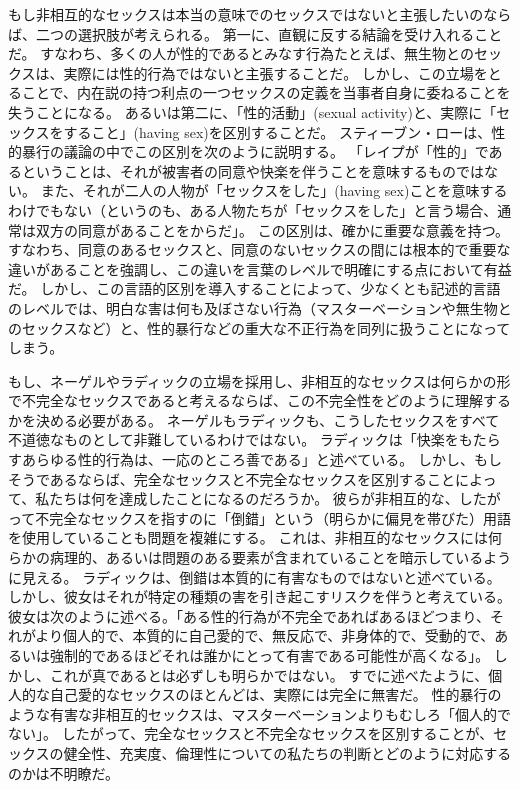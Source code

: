 \documentclass[paper=a4,book,openany]{jlreq} \usepackage{mystyle}
\begin{document}
もし非相互的なセックスは本当の意味でのセックスではないと主張したいのならば、二つの選択肢が考えられる。
第一に、直観に反する結論を受け入れることだ。
すなわち、多くの人が性的であるとみなす行為{\DDASH}たとえば、無生物とのセックス{\DDASH}は、実際には性的行為ではないと主張することだ。
しかし、この立場をとることで、内在説の持つ利点の一つ{\DDASH}セックスの定義を当事者自身に委ねること{\DDASH}を失うことになる。
あるいは第二に、「性的活動」(sexual activity)と、実際に「セックスをすること」(having sex)を区別することだ。
スティーブン・ローは、性的暴行の議論の中でこの区別を次のように説明する。
「レイプが「性的」であるということは、それが被害者の同意や快楽を伴うことを意味するものではない。
また、それが二人の人物が「セックスをした」(having sex)ことを意味するわけでもない（というのも、ある人物たちが「セックスをした」と言う場合、通常は双方の同意があることをからだ」\citep[p. 69]{law09:_rape_is_sex_act}。
この区別は、確かに重要な意義を持つ。
すなわち、同意のあるセックスと、同意のないセックスの間には根本的で重要な違いがあることを強調し、この違いを言葉のレベルで明確にする点において有益だ。
しかし、この言語的区別を導入することによって、少なくとも記述的言語のレベルでは、明白な害は何も及ぼさない行為（マスターベーションや無生物とのセックスなど）と、性的暴行などの重大な不正行為を同列に扱うことになってしまう。

もし、ネーゲルやラディックの立場を採用し、非相互的なセックスは何らかの形で不完全なセックスであると考えるならば、この不完全性をどのように理解するかを決める必要がある。
ネーゲルもラディックも、こうしたセックスをすべて不道徳なものとして非難しているわけではない。
ラディックは「快楽をもたらすあらゆる性的行為は、一応のところ善である」と述べている\citep[p.100]{ruddick75:_better_sex}。
しかし、もしそうであるならば、完全なセックスと不完全なセックスを区別することによって、私たちは何を達成したことになるのだろうか。
彼らが非相互的な、したがって不完全なセックスを指すのに「倒錯」という（明らかに偏見を帯びた）用語を使用していることも問題を複雑にする。
これは、非相互的なセックスには何らかの病理的、あるいは問題のある要素が含まれていることを暗示しているように見える。
ラディックは、倒錯は本質的に有害なものではないと述べている。
しかし、彼女はそれが特定の種類の害を引き起こすリスクを伴うと考えている。
彼女は次のように述べる。「ある性的行為が不完全であればあるほど{\DDASH}つまり、それがより個人的で、本質的に自己愛的で、無反応で、非身体的で、受動的で、あるいは強制的であるほど{\DDASH}それは誰かにとって有害である可能性が高くなる」\citep[pp. 100--101]{ruddick75:_better_sex}。
しかし、これが真であるとは必ずしも明らかではない。
すでに述べたように、個人的な自己愛的なセックスのほとんどは、実際には完全に無害だ。
性的暴行のような有害な非相互的セックスは、マスターベーションよりもむしろ「個人的でない」。
したがって、完全なセックスと不完全なセックスを区別することが、セックスの健全性、充実度、倫理性についての私たちの判断とどのように対応するのかは不明瞭だ。
\end{document}
